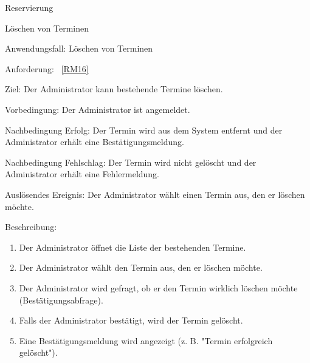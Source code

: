\begin{function}{20}{Reservierung}
\begin{function}{40}{Löschen von Terminen}
    \item[Anwendungsfall:] Löschen von Terminen
    \item[Anforderung:] ~\ref{RM16}
    \item[Ziel:] Der Administrator kann bestehende Termine löschen.
    \item[Vorbedingung:] Der Administrator ist angemeldet.
    \item[Nachbedingung Erfolg:] Der Termin wird aus dem System entfernt und der Administrator erhält eine Bestätigungsmeldung.
    \item[Nachbedingung Fehlschlag:] Der Termin wird nicht gelöscht und der Administrator erhält eine Fehlermeldung.
    \item[Auslösendes Ereignis:] Der Administrator wählt einen Termin aus, den er löschen möchte.
    \item[Beschreibung:] ~
    \begin{enumerate}
        \item Der Administrator öffnet die Liste der bestehenden Termine.
        \item Der Administrator wählt den Termin aus, den er löschen möchte.
        \item Der Administrator wird gefragt, ob er den Termin wirklich löschen möchte (Bestätigungsabfrage).
        \item Falls der Administrator bestätigt, wird der Termin gelöscht.
        \item Eine Bestätigungsmeldung wird angezeigt (z. B. "Termin erfolgreich gelöscht").
    \end{enumerate}
\end{function}


\end{function}
